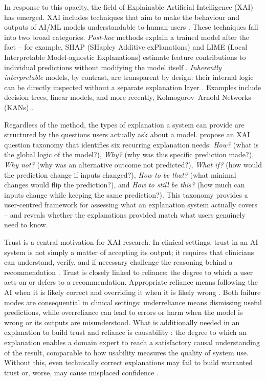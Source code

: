 \documentclass[12pt, a4paper]{article}
\begin{document}
In response to this opacity, the field of Explainable Artificial
Intelligence (XAI) has emerged. XAI includes techniques that aim to
make the behaviour and outputs of AI/ML models understandable to human users
\citep{arrieta2020xai, adadi2018peeking}. These techniques fall into two
broad categories. \emph{Post-hoc} methods explain a trained model after
the fact -- for example, SHAP (SHapley Additive exPlanations) and LIME
(Local Interpretable Model-agnostic Explanations) estimate feature
contributions to individual predictions without modifying the model itself
\citep{arrieta2020xai}. \emph{Inherently interpretable} models, by
contrast, are transparent by design: their internal logic can be directly
inspected without a separate explanation layer \citep{rudin2019stop}.
Examples include decision trees, linear models, and more recently,
Kolmogorov--Arnold Networks (KANs) \citep{liu2024kan}.

Regardless of the method, the types of explanation a system can provide
are structured by the questions users actually ask about a model.
\citet{liao2020questioning} propose an XAI question taxonomy that
identifies six recurring explanation needs: \emph{How?} (what is the
global logic of the model?), \emph{Why?} (why was this specific prediction
made?), \emph{Why not?} (why was an alternative outcome not predicted?),
\emph{What if?} (how would the prediction change if inputs changed?),
\emph{How to be that?} (what minimal changes would flip the prediction?),
and \emph{How to still be this?} (how much can inputs change while
keeping the same prediction?). This taxonomy provides a user-centred
framework for assessing what an explanation system actually covers --
and reveals whether the explanations provided match what users
genuinely need to know.

Trust is a central motivation for XAI research. In clinical settings,
trust in an AI system is not simply a matter of accepting its output; it
requires that clinicians can understand, verify, and if necessary
challenge the reasoning behind a recommendation \citep{tun2025trust}.
Trust is closely linked to reliance: the degree to which a
user acts on or defers to a recommendation. Appropriate reliance
means following the AI when it is likely correct and overriding it when it
is likely wrong \citep{liaovarshney2021human}. Both failure modes are
consequential in clinical settings: underreliance means
dismissing useful predictions, while overreliance can lead to
errors or harm when the model is wrong or its outputs are misunderstood.
What is additionally needed in an explanation to build trust and reliance 
is causability \citep{holzinger2019causability}: the degree to which an explanation enables a
domain expert to reach a satisfactory causal understanding of the result,
comparable to how usability measures the quality of system use. Without
this, even technically correct explanations may fail to build warranted
trust or, worse, may cause misplaced confidence \citep{ghassemi2021false}.
\end{document}
